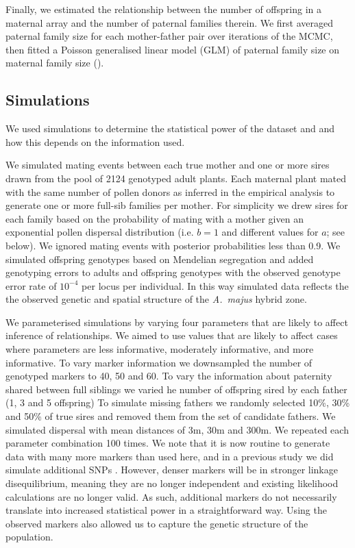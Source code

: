 \documentclass[10pt, a4paper, twocolumn]{article} %
\begin{document}
Finally, we estimated the relationship between the number of offspring in a maternal array and the number of paternal families therein.
We first averaged paternal family size for each mother-father pair over iterations of the MCMC, then fitted a Poisson generalised linear model (GLM) of paternal family size on maternal family size (\cite{McCullagh1989}).

\subsection{Simulations}

We used simulations to determine the statistical power of the dataset and and how this depends on the information used.

We simulated mating events between each true mother and one or more sires drawn from the pool of 2124 genotyped adult plants.
Each maternal plant mated with the same number of pollen donors as inferred in the empirical analysis to generate one or more full-sib families per mother.
For simplicity we drew sires for each family based on the probability of mating with a mother given an exponential pollen dispersal distribution (i.e. $b=1$ and different values for $a$; see below).
We ignored mating events with posterior probabilities less than 0.9.
We simulated offspring genotypes based on Mendelian segregation and added genotyping errors to adults and offspring genotypes with the observed genotype error rate of $10^{-4}$ per locus per individual.
In this way simulated data reflects the the observed genetic and spatial structure of the \textit{A.~majus} hybrid zone.

We parameterised simulations by varying four parameters that are likely to affect inference of relationships.
We aimed to use values that are likely to affect cases where parameters are less informative, moderately informative, and more informative.
To vary marker information we downsampled the number of genotyped markers to 40, 50 and 60.
To vary the information about paternity shared between full siblings we varied he number of offspring sired by each father (1, 3 and 5 offspring)
To simulate missing fathers we randomly selected 10\%, 30\% and 50\% of true sires and removed them from the set of candidate fathers.
We simulated dispersal with mean distances of 3m, 30m and 300m.
We repeated each parameter combination 100 times.
We note that it is now routine to generate data with many more markers than used here, and in a previous study we did simulate additional SNPs \citep{ellis2018efficient}.
However, denser markers will be in stronger linkage disequilibrium, meaning they are no longer independent and existing likelihood calculations are no longer valid.
As such, additional markers do not necessarily translate into increased statistical power in a straightforward way.
Using the observed markers also allowed us to capture the genetic structure of the population.
\end{document}
